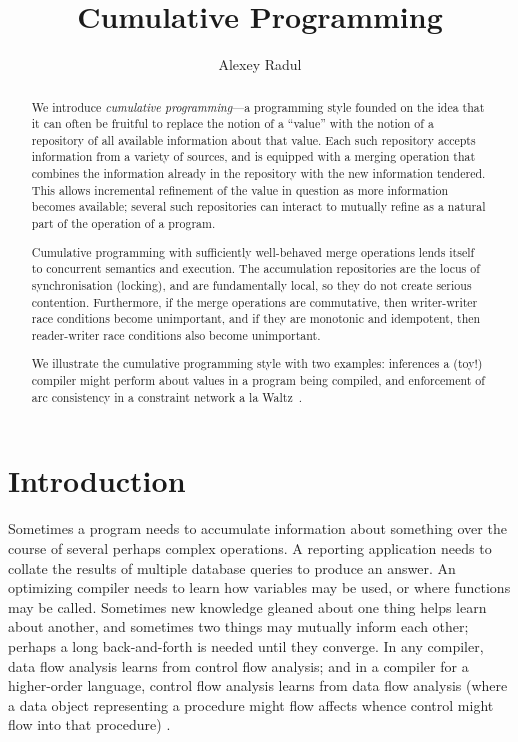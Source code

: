 \documentclass[12pt]{article}
\title{Cumulative Programming}
\author{Alexey Radul}
\begin{document}
\maketitle

\begin{abstract}
We introduce \emph{cumulative programming}---a programming style
founded on the idea that it can often be fruitful to replace the
notion of a ``value'' with the notion of a repository of all available
information about that value.  Each such repository accepts
information from a variety of sources, and is equipped with a merging
operation that combines the information already in the repository with
the new information tendered.  This allows incremental refinement of
the value in question as more information becomes available; several
such repositories can interact to mutually refine as a natural part
of the operation of a program.

Cumulative programming with sufficiently well-behaved merge operations
lends itself to concurrent semantics and execution.  The accumulation
repositories are the locus of synchronisation (locking), and are
fundamentally local, so they do not create serious contention.
Furthermore, if the merge operations are commutative, then writer-writer
race conditions become unimportant, and if they are monotonic and
idempotent, then reader-writer race conditions also become
unimportant.

We illustrate the cumulative programming style with two examples:
inferences a (toy!) compiler might perform about values in a program being
compiled, and enforcement of arc consistency in a constraint network a
la Waltz~\cite{?}.
\end{abstract}

\section{Introduction}

Sometimes a program needs to accumulate information about something
over the course of several perhaps complex operations.  A reporting
application needs to collate the results of multiple database queries
to produce an answer.  An optimizing compiler needs to learn how
variables may be used, or where functions may be called.  Sometimes
new knowledge gleaned about one thing helps learn about another, and
sometimes two things may mutually inform each other; perhaps a long
back-and-forth is needed until they converge.  In any compiler, data
flow analysis learns from control flow analysis; and in a compiler for
a higher-order language, control flow analysis learns from data flow
analysis (where a data object representing a procedure might flow
affects whence control might flow into that procedure)
\cite{shivers-1991-taming-lambda}.
\end{document}
